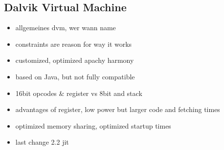 \subsection{Dalvik Virtual Machine} \label{subsection:android-dalvik}
\begin{itemize}
  \item allgemeines dvm, wer wann name
  \item constraints are reason for way it works
  \item customized, optimized apachy harmony
  \item based on Java, but not fully compatible
  \item 16bit opcodes \& register vs 8bit and stack
  \item advantages of register, low power but larger code and fetching times
  \item optimized memory sharing, optimized startup times
  \item last change 2.2 jit
\end{itemize}
